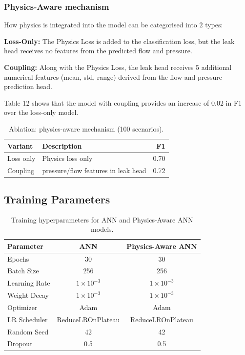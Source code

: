 \documentclass[final,5p,times,twocolumn,authoryear]{elsarticle}
\begin{document}
\subsubsection*{\textbf{Physics-Aware mechanism}}

How physics is integrated into the model can be categorised into 2 types:

\textbf{Loss-Only:} The Physics Loss is added to the classification loss, but the leak head receives no features from the predicted flow and pressure.

\textbf{Coupling:} Along with the Physics Loss, the leak head receives 5 additional numerical features (mean, std, range) derived from the flow and pressure prediction head.

Table 12 shows that the model with coupling provides an increase of 0.02 in F1 over the loss-only model.

\begin{table}[H]
\centering
\caption{Ablation: physics-aware mechanism (100 scenarios).}
\label{tab:abl_physics}
\small
\begin{tabular}{@{}llr@{}}
\toprule
\textbf{Variant} & \textbf{Description} & \textbf{F1} \\ \midrule
Loss only & Physics loss only & 0.70 \\
Coupling & pressure/flow features in leak head & 0.72 \\ 
\bottomrule
\end{tabular}
\end{table}

\subsection{Training Parameters}

\begin{table}[H]
\centering
\caption{Training hyperparameters for ANN and Physics-Aware ANN models.}
\label{tab:training_params}
\small
\begin{tabular}{@{}lcc@{}}
\toprule
\textbf{Parameter} & \textbf{ANN} & \textbf{Physics-Aware ANN} \\ \midrule
Epochs & 30 & 30 \\
Batch Size & 256 & 256 \\
Learning Rate & $1 \times 10^{-3}$ & $1 \times 10^{-3}$ \\
Weight Decay & $1 \times 10^{-3}$ & $1 \times 10^{-3}$ \\
Optimizer & Adam & Adam \\
LR Scheduler & ReduceLROnPlateau & ReduceLROnPlateau \\
Random Seed & 42 & 42 \\
Dropout & 0.5 & 0.5 \\
\bottomrule
\end{tabular}
\end{table}
\end{document}
